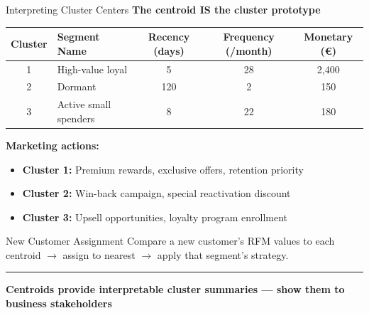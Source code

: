\documentclass[8pt,aspectratio=169]{beamer}
\newcommand{\bottomnote}[1]{%
\vfill
\vspace{-2mm}
\textcolor{mllavender2}{\rule{\textwidth}{0.4pt}}
\vspace{1mm}
\footnotesize
\textbf{#1}
}
\newenvironment{compactlist}{%
  \begin{itemize}%
    \setlength{\itemsep}{2pt}%
    \setlength{\parskip}{0pt}%
    \setlength{\parsep}{0pt}%
}{%
  \end{itemize}%
}
\begin{document}
\begin{frame}[t]{Interpreting Cluster Centers}
\small
\textbf{The centroid IS the cluster prototype}

\vspace{3mm}
\footnotesize
\begin{tabular}{clccc}
\toprule
\textbf{Cluster} & \textbf{Segment Name} & \textbf{Recency (days)} & \textbf{Frequency (/month)} & \textbf{Monetary (\euro{})} \\
\midrule
1 & High-value loyal & 5 & 28 & 2,400 \\
2 & Dormant & 120 & 2 & 150 \\
3 & Active small spenders & 8 & 22 & 180 \\
\bottomrule
\end{tabular}

\vspace{4mm}
\textbf{Marketing actions:}
\begin{compactlist}
\item \footnotesize \textcolor{mlblue}{\textbf{Cluster 1:}} Premium rewards, exclusive offers, retention priority
\item \footnotesize \textcolor{mlred}{\textbf{Cluster 2:}} Win-back campaign, special reactivation discount
\item \footnotesize \textcolor{mlgreen}{\textbf{Cluster 3:}} Upsell opportunities, loyalty program enrollment
\end{compactlist}

\vspace{3mm}
\begin{block}{New Customer Assignment}
\footnotesize Compare a new customer's RFM values to each centroid $\to$ assign to nearest $\to$ apply that segment's strategy.
\end{block}
\bottomnote{Centroids provide interpretable cluster summaries --- show them to business stakeholders}
\end{frame}
\end{document}
